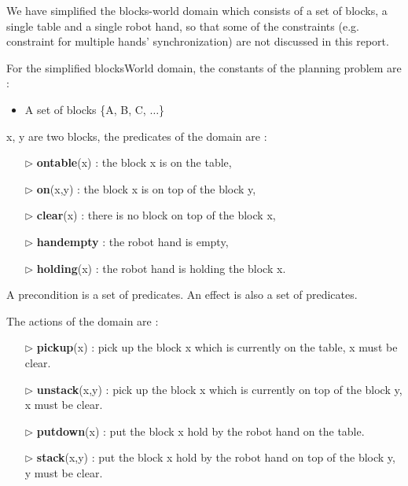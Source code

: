 We have simplified the blocks-world domain which consists of a set of blocks, a single table and a single robot hand, so that some of the constraints (e.g. constraint for multiple hands’ synchronization) are not discussed in this report.

For the simplified blocksWorld domain, the constants of the planning problem are :
\begin{itemize}\itemsep0pt \parskip0pt 
\item A set of blocks \{A, B, C, $\ldots$\}
\end{itemize}

x, y are two blocks, the predicates of the domain are :
\begin{itemize}\itemsep0pt \parskip0pt 
\item[$\triangleright$] \textbf{ontable}(x) : the block x is on the table,
\item[$\triangleright$] \textbf{on}(x,y) : the block x is on top of the block y,
\item[$\triangleright$] \textbf{clear}(x) : there is no block on top of the block x,
\item[$\triangleright$] \textbf{handempty} : the robot hand is empty,
\item[$\triangleright$] \textbf{holding}(x) : the robot hand is holding the block x.
\end{itemize}

A precondition is a set of predicates. An effect is also a set of predicates.

The actions of the domain are : 
\begin{itemize}\itemsep0pt \parskip0pt 
\item[$\triangleright$] \textbf{pickup}(x) : pick up the block x which is currently on the table, x must be clear.
\item[$\triangleright$] \textbf{unstack}(x,y) : pick up the block x which is currently on top of the block y, x must be clear.
\item[$\triangleright$] \textbf{putdown}(x) : put the block x hold by the robot hand on the table.
\item[$\triangleright$] \textbf{stack}(x,y) : put the block x hold by the robot hand on top of the block y, y must be clear.
\end{itemize}

